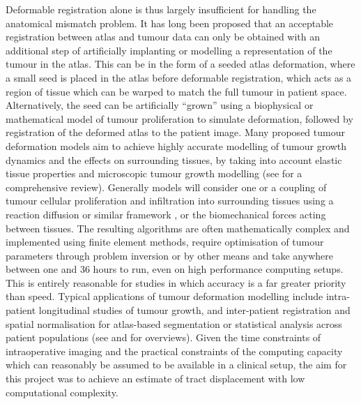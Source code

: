 \documentclass[12pt,phd,a4paper,twoside]{ucl_thesis}
\renewcommand{\textcite}[2][]{
\ifthenelse { \equal {#1} {} }  {\citeauthor{#2}\autocite{#2}}   {\citeauthor{#1}\autocite{#2}}}
\begin{document}
Deformable registration alone is thus largely insufficient for handling the anatomical mismatch problem\autocite{Elazab2018, Visser2020}.
It has long been proposed that an acceptable registration between atlas and tumour data can only be obtained with an additional step of artificially implanting or modelling a representation of the tumour in the atlas\autocite{Cabezas2011,Mang2020}.
This can be in the form of a seeded atlas deformation\autocite{Dawant2002}, where a small seed is placed in the atlas before deformable registration, which acts as a region of tissue which can be warped to match the full tumour in patient space.
Alternatively, the seed can be artificially ``grown'' using a biophysical or mathematical model of tumour proliferation to simulate deformation, followed by registration of the deformed atlas to the patient image\autocite{Cuadra2004, Zacharaki2009}.
Many proposed tumour deformation models aim to achieve highly accurate modelling of tumour growth dynamics and the effects on surrounding tissues, by taking into account elastic tissue properties and microscopic tumour growth modelling (see \textcite{Elazab2018} for a comprehensive review).
Generally models will consider one or a coupling\autocite{Clatz2005,Hogea2007,Prastawa2009} of tumour cellular proliferation and infiltration into surrounding tissues using a reaction diffusion or similar framework
\autocite{Tunc2021,Scheufele2019b,Elaff2018},
or the biomechanical forces acting between tissues\autocite{Mohamed2006,Hogea2007a,Zacharaki2009}.
The resulting algorithms are often mathematically complex and implemented using finite element methods\autocite{Elazab2018}, require optimisation of tumour parameters through problem inversion or by other means \autocite{Mohamed2006, Zacharaki2009, Mang2020} and take anywhere between one and 36 hours to run, even on high performance computing setups\autocite{Zacharaki2009,Bauer2012,Gooya2012,Bauer2013,Mang2012}.
This is entirely reasonable for studies in which accuracy is a far greater priority than speed.
Typical applications of tumour deformation modelling include intra-patient longitudinal studies of tumour growth, and inter-patient registration and spatial normalisation for atlas-based segmentation or statistical analysis across patient populations (see \textcite{Bauer2013} and \textcite{Cabezas2011} for overviews).
Given the time constraints of intraoperative imaging and the practical constraints of the computing capacity which can reasonably be assumed to be available in a clinical setup, the aim for this project was to achieve an estimate of tract displacement with low computational complexity.
\end{document}
